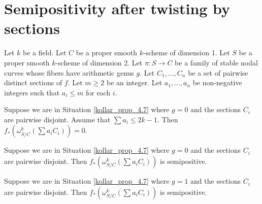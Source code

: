 \section{Semipositivity after twisting by sections}

\begin{situation}\label{kollar_prop_4.7}
Let $k$ be a field.
Let $C$ be a proper smooth $k$-scheme of dimension 1.
Let $S$ be a proper smooth $k$-scheme of dimension 2.
Let $\pi:S\to C$ be a family of stable nodal curves whose fibers have arithmetic genus $g$.
Let $C_1,\ldots,C_n$ be a set of pairwise distinct sections of $f$.
Let $m\ge2$ be an integer.
Let $a_1,\ldots,a_n$ be non-negative integers such that $a_i\le m$ for each $i$.
\end{situation}

\begin{lemma}\label{base_case_genus_0}
Suppose we are in Situation \ref{kollar_prop_4.7} where $g=0$ and the sections $C_i$ are pairwise disjoint.
Assume that $\sum a_i\le 2k-1$.
Then $f_{*}(\omega_{S/C}^{k}(\sum a_iC_i))=0$. 
\end{lemma}


\begin{lemma}\label{inductive_step_genus_0}
Suppose we are in Situation \ref{kollar_prop_4.7} where $g=0$ and the sections $C_i$ are pairwise disjoint.
Then $f_{*}(\omega_{S/C}^{k}(\sum a_iC_i))$ is semipositive.
\end{lemma}

\begin{lemma}\label{inductive_step_genus_1}
Suppose we are in Situation \ref{kollar_prop_4.7} where $g=1$ and the sections $C_i$ are pairwise disjoint.
Then $f_{*}(\omega_{S/C}^{k}(\sum a_iC_i))$ is semipositive.
\end{lemma}

